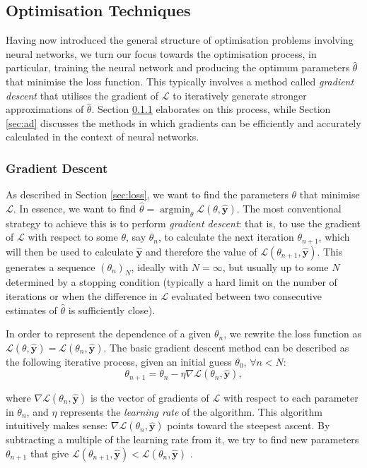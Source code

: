 \documentclass[a4paper,11pt,titlepage]{article}
\DeclareMathOperator*{\argmin}{argmin}
\theoremstyle{definition}
\theoremstyle{plain}
\theoremstyle{remark}
\begin{document}
\subsection{Optimisation Techniques}
\label{sec:opttech}

Having now introduced the general structure of optimisation problems involving neural networks, we turn our focus towards the optimisation process, in particular, training the neural network and producing the optimum parameters $\hat{\theta}$ that minimise the loss function. This typically involves a method called \textit{gradient descent} that utilises the gradient of $\mathcal{L}$ to iteratively generate stronger approximations of $\hat{\theta}$. Section \ref{sec:gd} elaborates on this process, while Section \ref{sec:ad} discusses the methods in which gradients can be efficiently and accurately calculated in the context of neural networks.

\subsubsection{Gradient Descent}
\label{sec:gd}

As described in Section \ref{sec:loss}, we want to find the parameters $\theta$ that minimise $\mathcal{L}$. In essence, we want to find $\hat{\theta} = \argmin_\theta \mathcal{L}(\theta, \mathbf{\hat{y}}) $. The most conventional strategy to achieve this is to perform \textit{gradient descent}: that is, to use the gradient of $\mathcal{L}$ with respect to some $\theta$, say $\theta_n$, to calculate the next iteration $\theta_{n+1}$, which will then be used to calculate $\mathbf{\hat{y}}$ and therefore the value of $\mathcal{L}(\theta_{n+1}, \mathbf{\hat{y}})$. This generates a sequence $(\theta_n)_N$, ideally with $N = \infty$, but usually up to some $N$ determined by a stopping condition (typically a hard limit on the number of iterations or when the difference in $\mathcal{L}$ evaluated between two consecutive estimates of $\hat{\theta}$ is sufficiently close). 

In order to represent the dependence of a given $\theta_n$, we rewrite the loss function as $\mathcal{L}(\theta,\mathbf{\hat{y}}) = \mathcal{L}(\theta_n, \mathbf{\hat{y}})$. The basic gradient descent method can be described as the following iterative process, given an initial guess $\theta_0$, $\forall n < N$:
$$\theta_{n+1} = \theta_n - \eta \nabla\mathcal{L}(\theta_n, \mathbf{\hat{y}}),$$

where $\nabla\mathcal{L}(\theta_n, \mathbf{\hat{y}})$ is the vector of gradients of $\mathcal{L}$ with respect to each parameter in $\theta_n$, and $\eta$ represents the \textit{learning rate} of the algorithm. This algorithm intuitively makes sense: $\nabla\mathcal{L}(\theta_n, \mathbf{\hat{y}})$ points toward the steepest ascent. By subtracting a multiple of the learning rate from it, we try to find new parameters $\theta_{n+1}$ that give $\mathcal{L}(\theta_{n+1}, \mathbf{\hat{y}}) < \mathcal{L}(\theta_{n}, \mathbf{\hat{y}})$ \cite{nazarathy2021}.
\end{document}

